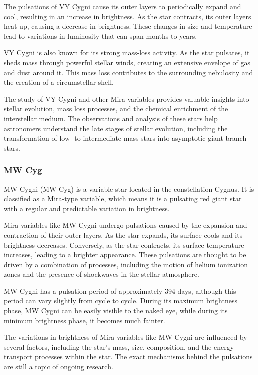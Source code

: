 The pulsations of VY Cygni cause its outer layers to periodically expand and cool, resulting in an increase in brightness. As the star contracts, its outer layers heat up, causing a decrease in brightness. These changes in size and temperature lead to variations in luminosity that can span months to years.

VY Cygni is also known for its strong mass-loss activity. As the star pulsates, it sheds mass through powerful stellar winds, creating an extensive envelope of gas and dust around it. This mass loss contributes to the surrounding nebulosity and the creation of a circumstellar shell.

The study of VY Cygni and other Mira variables provides valuable insights into stellar evolution, mass loss processes, and the chemical enrichment of the interstellar medium. The observations and analysis of these stars help astronomers understand the late stages of stellar evolution, including the transformation of low- to intermediate-mass stars into asymptotic giant branch stars.



\subsubsection*{ MW Cyg }
MW Cygni (MW Cyg) is a variable star located in the constellation Cygnus. It is classified as a Mira-type variable, which means it is a pulsating red giant star with a regular and predictable variation in brightness.

Mira variables like MW Cygni undergo pulsations caused by the expansion and contraction of their outer layers. As the star expands, its surface cools and its brightness decreases. Conversely, as the star contracts, its surface temperature increases, leading to a brighter appearance. These pulsations are thought to be driven by a combination of processes, including the motion of helium ionization zones and the presence of shockwaves in the stellar atmosphere.

MW Cygni has a pulsation period of approximately 394 days, although this period can vary slightly from cycle to cycle. During its maximum brightness phase, MW Cygni can be easily visible to the naked eye, while during its minimum brightness phase, it becomes much fainter.

The variations in brightness of Mira variables like MW Cygni are influenced by several factors, including the star's mass, size, composition, and the energy transport processes within the star. The exact mechanisms behind the pulsations are still a topic of ongoing research.

